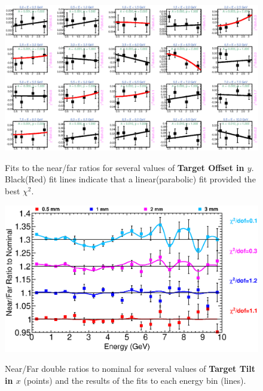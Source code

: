 \begin{figure}[ht]
  \begin{center}
    {\includegraphics[width=5.0in]{figures/TargetYOffset_nof_fits.eps}}
  \end{center}
\caption{ Fits to the near/far ratios for several values of {\bf Target Offset in $y$}. Black(Red) fit lines indicate that a linear(parabolic) fit provided the best $\chi^2$. }
\end{figure}

\begin{figure}[ht]
  \begin{center}
    {\includegraphics[width=6.0in]{figures/TargetXTilt_nof_summary.eps}}
  \end{center}
\caption{ Near/Far double ratios to nominal for several values of {\bf Target Tilt in $x$} (points) and the results of the fits to each energy bin (lines).}
\end{figure}

